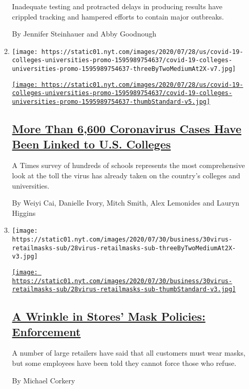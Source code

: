 \begin{enumerate}
\begin{enumerate}
    Inadequate testing and protracted delays in producing results have
    crippled tracking and hampered efforts to contain major outbreaks.

    By Jennifer Steinhauer and Abby Goodnough
  \item
    \texttt{[image: https://static01.nyt.com/images/2020/07/28/us/covid-19-colleges-universities-promo-1595989754637/covid-19-colleges-universities-promo-1595989754637-threeByTwoMediumAt2X-v7.jpg]}

    \href{/interactive/2020/07/28/us/covid-19-colleges-universities.html}{\texttt{[image: https://static01.nyt.com/images/2020/07/28/us/covid-19-colleges-universities-promo-1595989754637/covid-19-colleges-universities-promo-1595989754637-thumbStandard-v5.jpg]}}

    \hypertarget{more-than-6600-coronavirus-cases-have-been-linked-to-us-colleges}{%
    \subsection{\texorpdfstring{\href{/interactive/2020/07/28/us/covid-19-colleges-universities.html}{More
    Than 6,600 Coronavirus Cases Have Been Linked to U.S.
    Colleges}}{More Than 6,600 Coronavirus Cases Have Been Linked to U.S. Colleges}}\label{more-than-6600-coronavirus-cases-have-been-linked-to-us-colleges}}

    A Times survey of hundreds of schools represents the most
    comprehensive look at the toll the virus has already taken on the
    country's colleges and universities.

    By Weiyi Cai, Danielle Ivory, Mitch Smith, Alex Lemonides and Lauryn
    Higgins
  \item
    \texttt{[image: https://static01.nyt.com/images/2020/07/30/business/30virus-retailmasks-sub/28virus-retailmasks-sub-threeByTwoMediumAt2X-v3.jpg]}

    \href{/2020/07/29/business/coronavirus-masks-stores-walmart.html}{\texttt{[image: https://static01.nyt.com/images/2020/07/30/business/30virus-retailmasks-sub/28virus-retailmasks-sub-thumbStandard-v3.jpg]}}

    \hypertarget{a-wrinkle-in-stores-mask-policies-enforcement}{%
    \subsection{\texorpdfstring{\href{/2020/07/29/business/coronavirus-masks-stores-walmart.html}{A
    Wrinkle in Stores' Mask Policies:
    Enforcement}}{A Wrinkle in Stores' Mask Policies: Enforcement}}\label{a-wrinkle-in-stores-mask-policies-enforcement}}

    A number of large retailers have said that all customers must wear
    masks, but some employees have been told they cannot force those who
    refuse.

    By Michael Corkery
  \end{enumerate}
\end{enumerate}

